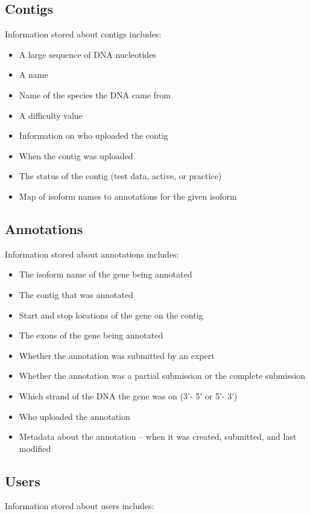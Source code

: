 \documentclass[12pt]{ucthesis}
\begin{document}
\subsection{Contigs}
Information stored about contigs includes:

\begin{itemize}
\item A large sequence of DNA nucleotides
\item A name
\item Name of the species the DNA came from
\item A difficulty value
\item Information on who uploaded the contig
\item When the contig was uploaded
\item The status of the contig (test data, active, or practice)
\item Map of isoform names to annotations for the given isoform
\end{itemize}

\subsection{Annotations}
Information stored about annotations includes:

\begin{itemize}
\item The isoform name of the gene being annotated
\item The contig that was annotated
\item Start and stop locations of the gene on the contig
\item The exons of the gene being annotated
\item Whether the annotation was submitted by an expert
\item Whether the annotation was a partial submission or the complete submission
\item Which strand of the DNA the gene was on (3'- 5' or 5'- 3')
\item Who uploaded the annotation
\item Metadata about the annotation -- when it was created, submitted, and last modified
\end{itemize}

\subsection{Users}
Information stored about users includes:
\end{document}

